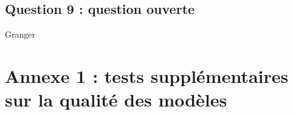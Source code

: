\documentclass[]{article}
\begin{document}
\hypertarget{question-9-question-ouverte}{%
\subsection{Question 9 : question ouverte}\label{question-9-question-ouverte}}

Granger

\hypertarget{appendix-appendix}{%
\appendix}


\hypertarget{sec:qualRes}{%
\section{Annexe 1 : tests supplémentaires sur la qualité des modèles}\label{sec:qualRes}}

\begin{table}[!h]


\end{table}
\end{document}
